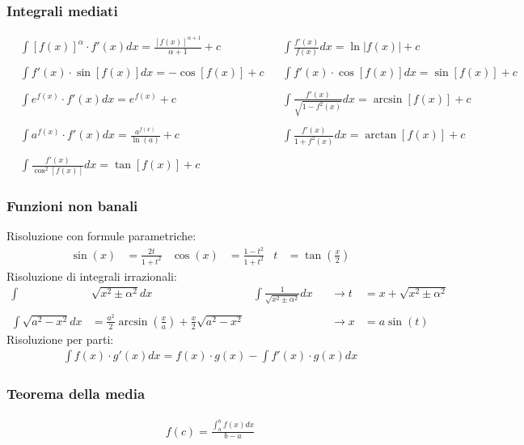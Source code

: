 \documentclass[a4paper]{article}
\begin{document}
	\subsubsection{Integrali mediati}
	\begin{align*}
		&\int [f(x)]^\alpha \cdot f'(x) dx 	= \frac{[f(x)]^{\alpha + 1}}{\alpha + 1}+c		&	&\int \frac{f'(x)}{f(x)}dx = \ln |f(x)| + c\\\\
		&\int f'(x) \cdot \sin [f(x)] dx		= -\cos [f(x)] + c								&	&\int f'(x) \cdot \cos [f(x)] dx = \sin [f(x)] + c\\\\
		&\int e^{f(x)} \cdot f'(x) dx 		= e^{f(x)}+c									&	&\int \frac{f'(x)}{\sqrt{1-f^2(x)}}dx = \arcsin[f(x)] + c\\\\
		&\int a^{f(x)} \cdot f'(x) dx		= \frac{a^{f(x)}}{\ln (a)}+c					&	&\int \frac{f'(x)}{1+f^2(x)}dx = \arctan [f(x)] + c\\\\
		&\int \frac{f'(x)}{\cos^2 [f(x)]}dx	= \tan [f(x)] + c  		
	\end{align*}
	\subsubsection{Funzioni non banali}
	Risoluzione con formule parametriche:
	\begin{align*}
		\sin (x) &= \frac{2t}{1+t^2}		&		\cos (x) &= \frac{1-t^2}{1+t^2}			& 	t &= \tan \left( \frac{x}{2} \right)
	\end{align*}
	Risoluzione di integrali irrazionali:
	\begin{align*}
		\int & \sqrt{x^2 \pm \alpha^2}	dx		&		\int  \frac{1}{\sqrt{x^2 \pm \alpha^2}}dx&	&	\rightarrow t &= x + \sqrt{x^2 \pm \alpha^2}\\\\
		\int \sqrt{a^2 - x^2}dx &= \frac{a^2}{2}\arcsin \left( \frac{x}{a} \right) + \frac{x}{2}\sqrt{a^2-x^2}	&&	&		\rightarrow x &= a\sin (t)
	\end{align*}
	Risoluzione per parti:
	\begin{align*}
		\int f(x) \cdot g'(x) dx = f(x) \cdot g(x) - \int f'(x) \cdot g(x) dx
	\end{align*}
		
	\subsubsection{Teorema della media}
	\begin{align*}
		f(c) = \frac{\int_{a}^{b}f(x)dx}{b-a}
	\end{align*}
\end{document}
